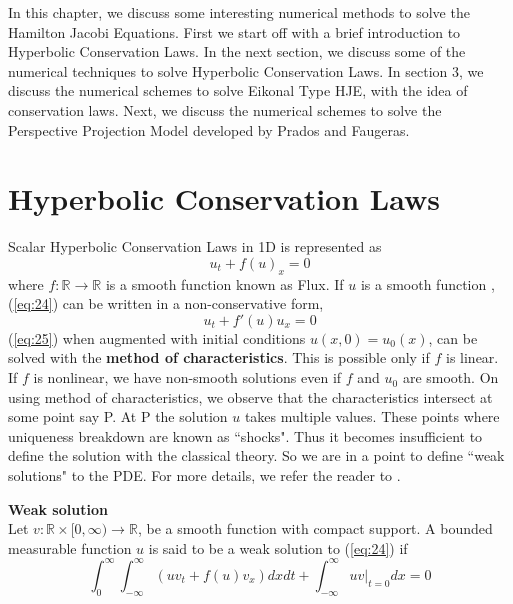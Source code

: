 In this chapter, we discuss some interesting numerical methods to
solve the Hamilton Jacobi Equations. First we start off with a brief
introduction to Hyperbolic Conservation Laws. In the next section, we
discuss some of the numerical techniques to solve Hyperbolic
Conservation Laws. In section 3, we discuss the numerical schemes to
solve Eikonal Type HJE, with the idea of conservation laws. Next, we discuss the numerical schemes to solve the Perspective Projection Model developed by Prados and Faugeras\cite{prados2}.


\section{Hyperbolic Conservation Laws}
Scalar Hyperbolic Conservation Laws in 1D is represented as
\begin{equation}
	u_t + f(u)_x = 0 \label{eq:24}
\end{equation}
where $f:\mathbb{R} \to \mathbb{R}$ is a smooth function known as Flux. If $u$ is a smooth function ,(\ref{eq:24}) can be written in a non-conservative form,
\begin{equation}
	u_t + f'(u)u_x = 0\label{eq:25}
\end{equation}
(\ref{eq:25}) when augmented with initial conditions $u(x,0) = u_0(x)$, can be solved with the \textbf{method of characteristics}. This is possible only if $f$ is linear. If $f$ is nonlinear, we have non-smooth solutions even if $f$ and $u_0$ are smooth. On using method of characteristics, we observe that the characteristics intersect at some point say P. At P the solution $u$ takes multiple values. These points where uniqueness breakdown are known as ``shocks". Thus it becomes insufficient to define the solution with the classical theory. So we are in a point to define ``weak solutions" to the PDE. For more details, we refer the reader to \cite{leve}.
\begin{definition}
	\textbf{Weak solution}\\
	
	\noindent
	Let $v : \mathbb{R} \times [0,\infty) \to \mathbb{R} $, be a smooth function with compact support. A bounded measurable function $u$ is said to be a weak solution to (\ref{eq:24}) if
	\begin{equation}
		\int_{0}^{\infty} \int_{-\infty}^{\infty} \left(uv_t + f(u)v_x\right) dxdt + \int_{-\infty}^{\infty} u v|_{t=0}dx = 0 \label{eq:26}
	\end{equation}
\end{definition}


